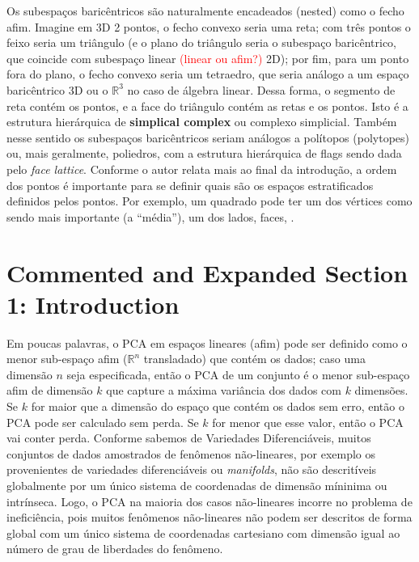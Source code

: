 \documentclass[a4paper,titlepage]{article}
\newcommand{\juliana}[1]{\textcolor{red}{#1}}
\begin{document}
Os subespaços baricêntricos são naturalmente encadeados (nested) como o fecho
afim. Imagine em 3D 2 pontos, o fecho convexo seria uma reta; com três pontos o
feixo seria um triângulo (e o plano do triângulo seria o subespaço
baricêntrico, que coincide com subespaço linear \juliana{(linear ou afim?)} 2D); por fim, para um ponto fora do plano, o fecho convexo seria um tetraedro, que seria análogo a um espaço baricêntrico 3D ou o $\mathbb R^3$ no caso de álgebra linear. Dessa forma, o segmento de reta contém os pontos, e a face do triângulo contém as retas e os pontos. Isto é a estrutura hierárquica de \textbf{simplical complex}
ou complexo simplicial. Também nesse sentido os subespaços baricêntricos seriam
análogos a polítopos (polytopes) ou, mais geralmente, poliedros, com a estrutura
hierárquica de flags sendo dada pelo \emph{face lattice}. Conforme o autor
relata mais ao final da introdução, a ordem dos pontos é importante para se
definir quais são os espaços estratificados definidos pelos pontos. Por exemplo,
um quadrado pode ter um dos vértices como sendo mais importante (a ``média''),
um dos lados, faces, \etc. 

\section{Commented and Expanded Section 1: Introduction}\label{sec:intro}

\begin{center}
\vspace{1em}
\vspace{1em}
\end{center}

Em poucas palavras, o PCA em espaços lineares (afim) pode ser definido
como o menor sub-espaço afim ($\mathbb R^n$ transladado) que contém os dados;
caso uma dimensão $n$ seja especificada, então o PCA de um conjunto é 
o menor sub-espaço afim de dimensão $k$ que capture a máxima variância dos dados
com $k$ dimensões. Se $k$ for maior que a dimensão do espaço que contém os dados
sem erro, então o PCA pode ser calculado sem perda. Se $k$ for menor que esse
valor, então o PCA vai conter perda. Conforme sabemos de Variedades
Diferenciáveis, muitos conjuntos de dados amostrados de fenômenos não-lineares,
por exemplo os provenientes de variedades diferenciáveis ou \emph{manifolds},
não são descritíveis globalmente por um único sistema de coordenadas de dimensão
míninima ou intrínseca. Logo, o PCA na maioria dos casos não-lineares incorre no
problema de ineficiência, pois muitos fenômenos não-lineares não podem ser
descritos de forma global com um único sistema de coordenadas cartesiano com
dimensão igual ao número de grau de liberdades do fenômeno.
\end{document}
